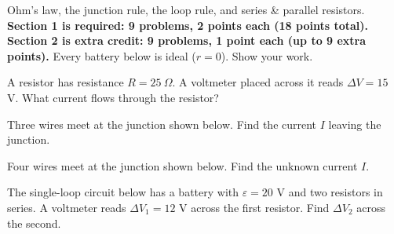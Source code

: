 \documentclass[12pt]{article}
\newcommand{\battv}[1]{%
  \draw[line width=0.7pt] ($(#1)+(0,0.55)$) -- ($(#1)+(0,0.12)$);
  \draw[line width=0.7pt] ($(#1)+(0,-0.12)$) -- ($(#1)+(0,-0.55)$);
  \draw[line width=1.1pt] ($(#1)+(-0.35,0.12)$) -- ($(#1)+(0.35,0.12)$);
  \draw[line width=2.4pt] ($(#1)+(-0.2,-0.12)$) -- ($(#1)+(0.2,-0.12)$);
  \node[scale=0.75] at ($(#1)+(0.6,0.12)$) {$+$};
  \node[scale=0.75] at ($(#1)+(0.6,-0.12)$) {$-$};
}
\newcommand{\reszig}[1]{%
  \fill[white] ($(#1)+(-0.65,-0.32)$) rectangle ($(#1)+(0.65,0.32)$);
  \draw ($(#1)+(-0.6,0)$)
    -- ($(#1)+(-0.42,0.22)$) -- ($(#1)+(-0.24,-0.22)$)
    -- ($(#1)+(-0.06,0.22)$) -- ($(#1)+(0.12,-0.22)$)
    -- ($(#1)+(0.3,0.22)$) -- ($(#1)+(0.48,-0.22)$)
    -- ($(#1)+(0.6,0)$);
}
\newcommand{\jarrow}[3]{%
  \ifstrequal{#2}{in}{%
    \draw[-{Stealth[length=3mm]}, line width=1pt] (#1:1.5) -- (0,0);
  }{%
    \draw[-{Stealth[length=3mm]}, line width=1pt] (0,0) -- (#1:1.5);
  }%
  \node[scale=0.85] at (#1:1.95) {#3};%
}
\begin{document}

\noindent Ohm's law, the junction rule, the loop rule, and series \&
parallel resistors. \textbf{Section 1 is required: 9 problems, 2 points
each (18 points total).} \textbf{Section 2 is extra credit: 9 problems, 1
point each (up to 9 extra points).} Every battery below is ideal
($r=0$). Show your work.


\prob A resistor has resistance $R=25\ \Omega$. A voltmeter placed across
it reads $\Delta V=15$ V. What current flows through the resistor?


\prob Three wires meet at the junction shown below. Find the current $I$
leaving the junction.

\begin{center}
\end{center}


\prob Four wires meet at the junction shown below. Find the unknown
current $I$.

\begin{center}
\end{center}


\prob The single-loop circuit below has a battery with $\varepsilon=20$ V
and two resistors in series. A voltmeter reads $\Delta V_1=12$ V across
the first resistor. Find $\Delta V_2$ across the second.

\begin{center}
\end{center}
\end{document}
